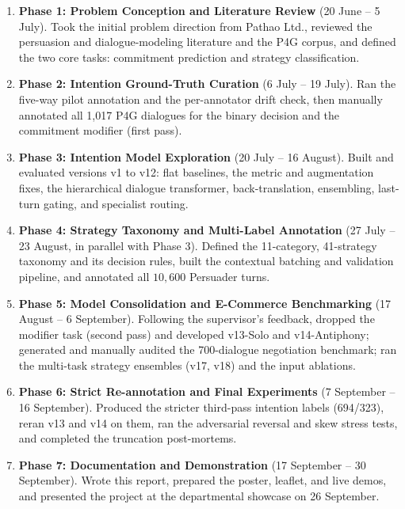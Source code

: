 \begin{enumerate}
  \item \textbf{Phase 1: Problem Conception and Literature Review} (20 June -- 5 July). Took the initial problem direction from Pathao Ltd., reviewed the persuasion and dialogue-modeling literature and the P4G corpus, and defined the two core tasks: commitment prediction and strategy classification.
  \item \textbf{Phase 2: Intention Ground-Truth Curation} (6 July -- 19 July). Ran the five-way pilot annotation and the per-annotator drift check, then manually annotated all 1,017 P4G dialogues for the binary decision and the commitment modifier (first pass).
  \item \textbf{Phase 3: Intention Model Exploration} (20 July -- 16 August). Built and evaluated versions v1 to v12: flat baselines, the metric and augmentation fixes, the hierarchical dialogue transformer, back-translation, ensembling, last-turn gating, and specialist routing.
  \item \textbf{Phase 4: Strategy Taxonomy and Multi-Label Annotation} (27 July -- 23 August, in parallel with Phase 3). Defined the 11-category, 41-strategy taxonomy and its decision rules, built the contextual batching and validation pipeline, and annotated all $10{,}600$ Persuader turns.
  \item \textbf{Phase 5: Model Consolidation and E-Commerce Benchmarking} (17 August -- 6 September). Following the supervisor's feedback, dropped the modifier task (second pass) and developed v13-Solo and v14-Antiphony; generated and manually audited the 700-dialogue negotiation benchmark; ran the multi-task strategy ensembles (v17, v18) and the input ablations.
  \item \textbf{Phase 6: Strict Re-annotation and Final Experiments} (7 September -- 16 September). Produced the stricter third-pass intention labels (694/323), reran v13 and v14 on them, ran the adversarial reversal and skew stress tests, and completed the truncation post-mortems.
  \item \textbf{Phase 7: Documentation and Demonstration} (17 September -- 30 September). Wrote this report, prepared the poster, leaflet, and live demos, and presented the project at the departmental showcase on 26 September.
\end{enumerate}

